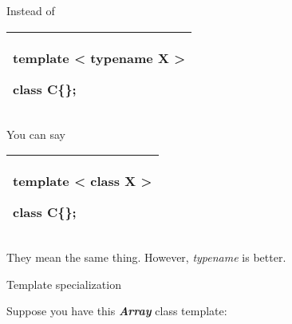 \documentclass[
]{article}
\begin{document}
Instead of

\begin{longtable}[]{@{}l@{}}
\toprule
\endhead
\begin{minipage}[t]{0.97\columnwidth}\raggedright
template \textless{} \textbf{typename} X \textgreater{}

class C\{\};\strut
\end{minipage}\tabularnewline
\bottomrule
\end{longtable}

You can say

\begin{longtable}[]{@{}l@{}}
\toprule
\endhead
\begin{minipage}[t]{0.97\columnwidth}\raggedright
template \textless{} \textbf{class} X \textgreater{}

class C\{\};\strut
\end{minipage}\tabularnewline
\bottomrule
\end{longtable}

They mean the same thing. However, \emph{typename} is better.

Template specialization

Suppose you have this \emph{\textbf{Array}} class template:
\end{document}
